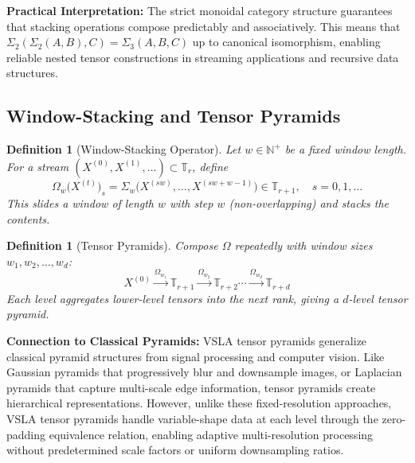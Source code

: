 \documentclass[11pt]{article}
\newtheorem{definition}[theorem]{Definition}
\begin{document}
\textbf{Practical Interpretation:} The strict monoidal category structure guarantees that stacking operations compose predictably and associatively. This means that $\Sigma_2(\Sigma_2(A,B),C) = \Sigma_3(A,B,C)$ up to canonical isomorphism, enabling reliable nested tensor constructions in streaming applications and recursive data structures.

\subsection{Window-Stacking and Tensor Pyramids}

\begin{definition}[Window-Stacking Operator]
Let $w \in \mathbb{N}^+$ be a fixed \emph{window length}. For a stream $(X^{(0)}, X^{(1)}, \ldots) \subset \mathbb{T}_r$, define
\[
\Omega_w\bigl(X^{(t)}\bigr)_s = \Sigma_w\bigl(X^{(sw)}, \ldots, X^{(sw+w-1)}\bigr) \in \mathbb{T}_{r+1}, \quad s = 0, 1, \ldots
\]
This slides a window of length $w$ with step $w$ (non-overlapping) and stacks the contents.
\end{definition}

\begin{definition}[Tensor Pyramids]
Compose $\Omega$ repeatedly with window sizes $w_1, w_2, \ldots, w_d$:
\[
X^{(0)} \xrightarrow{\Omega_{w_1}} \mathbb{T}_{r+1} \xrightarrow{\Omega_{w_2}} \mathbb{T}_{r+2} \cdots \xrightarrow{\Omega_{w_d}} \mathbb{T}_{r+d}
\]
Each level aggregates lower-level tensors into the next rank, giving a \emph{$d$-level tensor pyramid}.
\end{definition}

\textbf{Connection to Classical Pyramids:} VSLA tensor pyramids generalize classical pyramid structures from signal processing and computer vision. Like Gaussian pyramids that progressively blur and downsample images, or Laplacian pyramids that capture multi-scale edge information, tensor pyramids create hierarchical representations. However, unlike these fixed-resolution approaches, VSLA tensor pyramids handle variable-shape data at each level through the zero-padding equivalence relation, enabling adaptive multi-resolution processing without predetermined scale factors or uniform downsampling ratios.
\end{document}
